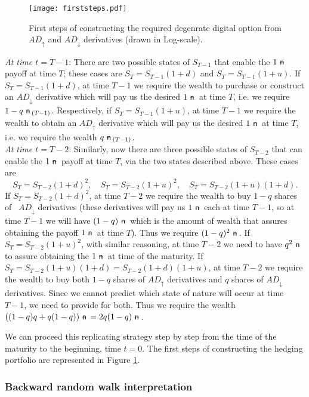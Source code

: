 \documentclass{amsart}
\theoremstyle{definition}
\theoremstyle{remark}
\newcommand{\n}{\!\!\ \nn \!\!\ }
\def\nn{\mathrel{%
    \mathchoice{\n}{\n}{\scriptsize\n}{\tiny\n}%
}}
\def\n {{%
    \setbox0\hbox{ \textsf{n}\!\  }%
    \rlap{\hbox to \wd0{\hss \!\ --\hss}}\box0
}}
\numberwithin{equation}{section}
\newcommand{\1}{\boldsymbol{1}}
\newcommand{\ua}{\uparrow}
\newcommand{\da}{\downarrow}
\begin{document}
\begin{figure}[h!]
\begin{center}
\texttt{[image: firststeps.pdf]}
\caption{First steps of constructing the required degenrate digital option from $AD_{\ua}$ and $AD_{\da}$ derivatives (drawn in Log-scale).}
\label{figure:firststeps}
\end{center}
\end{figure}

 
{\noindent \emph{At time $t=T-1$}}: There are two possible states of $S_{T-1}$ that enable the $1\n$ payoff at time $T$; these cases are $S_T=S_{T-1}(1+d)$ and  $S_T=S_{T-1}(1+u)$. If $S_T=S_{T-1}(1+d)$, at time $T-1$ we require the wealth to purchase or construct an $AD_{\da}$ derivative which will pay us the desired $1 \n$ at time $T$, i.e. we require $1-q  \n_{(T-1)}$. Respectively, if $S_T=S_{T-1}(1+u)$, at time $T-1$ we require the wealth to obtain an $AD_{\ua}$ derivative which will pay us the desired $1 \n$ at time $T$, i.e. we require the wealth $q \n_{(T-1)}$.
\ \\ 

{\noindent \emph{At time $t=T-2$}}: Similarly, now there are three possible states of $S_{T-2}$
that can enable the $1\n$ payoff at time $T$, via the two states described above. These cases are 
\[S_T=S_{T-2}(1+d)^2,\quad  S_T=S_{T-2}(1+u)^2 ,\quad  S_T=S_{T-2}(1+u)(1+d) .\] 
If $S_T=S_{T-2}(1+d)^2$, at time $T-2$ we require the wealth to buy $1-q$ shares of \ $AD_{\da}$ derivatives (these derivatives will pay us $1 \n$ each at time $T-1$, so at time $T-1$ we will have $(1-q) \n$ which is the amount of wealth that assures obtaining the payoff $1\n$ at time $T$). Thus we require $(1-q)^2 \n$. If $S_T=S_{T-2}(1+u)^2$, with similar reasoning, at time $T-2$ we need to have $q^2 \n$ to assure obtaining the $1 \n$ at time of the maturity. If $S_T=S_{T-2}(1+u)(1+d)=S_{T-2}(1+d)(1+u)$, at time $T-2$ we require the wealth to buy both $1-q$ shares of $AD_{\ua}$ derivatives and $q$ shares of $AD_{\da}$ derivatives. Since we cannot predict which state of nature will occur at time $T-1$, we need to provide for both. Thus we require the wealth $((1-q)q+q(1-q)) \n =2q(1-q) \n$.
 
We can proceed this replicating strategy step by step from the time of the maturity to the beginning, time $t=0$. 
The first steps of constructing the hedging portfolio are represented in Figure \ref{figure:firststeps}.
 
\subsubsection{Backward random walk interpretation} 
 
\end{document}
